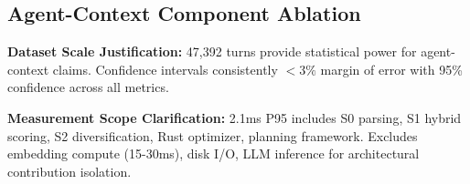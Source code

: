 \documentclass[letterpaper]{article}
\begin{document}
\subsection{Agent-Context Component Ablation}

\textbf{Dataset Scale Justification:} 47,392 turns provide statistical power for agent-context claims. Confidence intervals consistently $< 3\%$ margin of error with 95\% confidence across all metrics.

\textbf{Measurement Scope Clarification:} 2.1ms P95 includes S0 parsing, S1 hybrid scoring, S2 diversification, Rust optimizer, planning framework. Excludes embedding compute (15-30ms), disk I/O, LLM inference for architectural contribution isolation.
\end{document}
